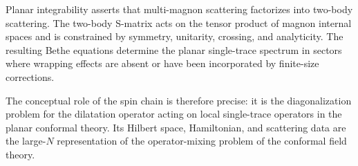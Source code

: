 Planar integrability asserts that multi-magnon scattering factorizes into
two-body scattering.  The two-body S-matrix acts on the tensor product of
magnon internal spaces and is constrained by symmetry, unitarity, crossing,
and analyticity.  The resulting Bethe equations determine the planar
single-trace spectrum in sectors where wrapping effects are absent or have
been incorporated by finite-size corrections.

The conceptual role of the spin chain is therefore precise: it is the
diagonalization problem for the dilatation operator acting on local
single-trace operators in the planar conformal theory.  Its Hilbert space,
Hamiltonian, and scattering data are the large-\(N\) representation of the
operator-mixing problem of the conformal field theory.
